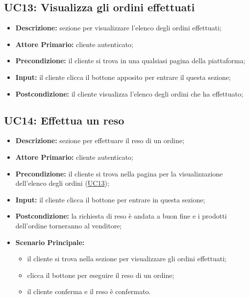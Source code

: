         \subsection{UC13: Visualizza gli ordini effettuati}
        \label{sec:UC13}
        \begin{itemize}
            \item \textbf{Descrizione:} sezione per visualizzare l'elenco degli ordini effettuati;
            \item \textbf{Attore Primario:} cliente autenticato;
            \item \textbf{Precondizione:} il cliente si trova in una qualsiasi pagina della piattaforma;
            \item \textbf{Input:} il cliente clicca il bottone apposito per entrare il questa sezione;
            \item \textbf{Postcondizione:} il cliente visualizza l'elenco degli ordini che ha effettuato;
        \end{itemize}


        \subsection{UC14: Effettua un reso}
        \begin{itemize}
            \item \textbf{Descrizione:} sezione per effettuare il reso di un ordine;
            \item \textbf{Attore Primario:} cliente autenticato;
            \item \textbf{Precondizione:} il cliente si trova nella pagina per la visualizzazione dell'elenco degli ordini (\hyperref[sec:UC13]{UC13});
            \item \textbf{Input:} il cliente clicca il bottone per entrare in questa sezione;
            \item \textbf{Postcondizione:} la richiesta di reso è andata a buon fine e i prodotti dell'ordine torneranno al venditore;
            \item \textbf{Scenario Principale:}
                \begin{itemize}
                    \item il cliente si trova nella sezione per visualizzare gli ordini effettuati;
                    \item clicca il bottone per eseguire il reso di un ordine;
                    \item il cliente conferma e il reso è confermato.
                \end{itemize}
        \end{itemize}


